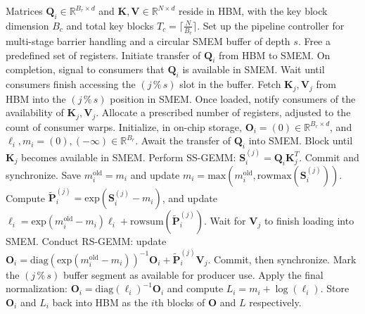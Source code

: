\begin{enumerate}
\begin{algorithm}[H]
    \caption{\small\label{alg:flash3_wgmma_ws_only}\textsc{FlashAttention-3} forward computation \textbf{excluding} intra-consumer overlap -- CTA-centric structure}
    \begin{algorithmic}[1]
\REQUIRE Matrices $\mathbf{Q}_i \in \mathbb{R}^{B_r \times d}$ and $\mathbf{K}, \mathbf{V} \in \mathbb{R}^{N \times d}$ reside in HBM, with the key block dimension $B_c$ and total key blocks $T_c = \lceil \frac{N}{B_c} \rceil$.
\STATE Set up the pipeline controller for multi-stage barrier handling and a circular SMEM buffer of depth $s$.
\STATE Free a predefined set of registers.
\STATE Initiate transfer of $\mathbf{Q}_i$ from HBM to SMEM.
\STATE On completion, signal to consumers that $\mathbf{Q}_i$ is available in SMEM.
    \STATE Wait until consumers finish accessing the $(j\,\%\,s)$ slot in the buffer.
    \STATE Fetch $\mathbf{K}_j, \mathbf{V}_j$ from HBM into the $(j\,\%\,s)$ position in SMEM.
    \STATE Once loaded, notify consumers of the availability of $\mathbf{K}_j, \mathbf{V}_j$.
\ENDFOR
\ELSE \STATE Allocate a prescribed number of registers, adjusted to the count of consumer warps.
\STATE Initialize, in on-chip storage, $\mathbf{O}_i = (0) \in \mathbb{R}^{B_r \times d}$, and $\ell_i, m_i = (0), (-\infty) \in \mathbb{R}^{B_r}$.
\STATE Await the transfer of $\mathbf{Q}_i$ into SMEM.
\STATE Block until $\mathbf{K}_j$ becomes available in SMEM.
\STATE Perform SS-GEMM: $\mathbf{S}_i^{(j)} = \mathbf{Q}_i \mathbf{K}_j^T$. Commit and synchronize. \label{alg:ws_only_gemm1}
\STATE Save $m_i^{\mathrm{old}} = m_i$ and update $m_i = \mathrm{max}(m_i^{\mathrm{old}}, \mathrm{rowmax}(\mathbf{S}_i^{(j)}))$. \label{code-ws:softmax_start}
\STATE Compute $\widetilde{\mathbf{P}}_i^{(j)} = \mathrm{exp}(\mathbf{S}_i^{(j)} - m_i)$, and update $\ell_i = \mathrm{exp}(m_i^{\mathrm{old}} - m_i) \ell_i + \mathrm{rowsum}(\widetilde{\mathbf{P}}_i^{(j)})$. \label{code-ws:softmax_end}
\STATE Wait for $\mathbf{V}_j$ to finish loading into SMEM.
\STATE Conduct RS-GEMM: update $\mathbf{O}_i = \mathrm{diag}(\mathrm{exp}(m_i^{\mathrm{old}} - m_i))^{-1} \mathbf{O}_i + \widetilde{\mathbf{P}}_i^{(j)} \mathbf{V}_j$. Commit, then synchronize. \label{alg:ws_only_gemm2}
\STATE Mark the $(j\,\%\,s)$ buffer segment as available for producer use.
\ENDFOR
\STATE Apply the final normalization: $\mathbf{O}_i = \mathrm{diag}(\ell_i)^{-1} \mathbf{O}_i$ and compute $L_i = m_i + \log(\ell_i)$.
\STATE Store $\mathbf{O}_i$ and $L_i$ back into HBM as the $i$th blocks of $\mathbf{O}$ and $L$ respectively.
\ENDIF
\end{algorithmic}
\end{algorithm}


\end{enumerate}
